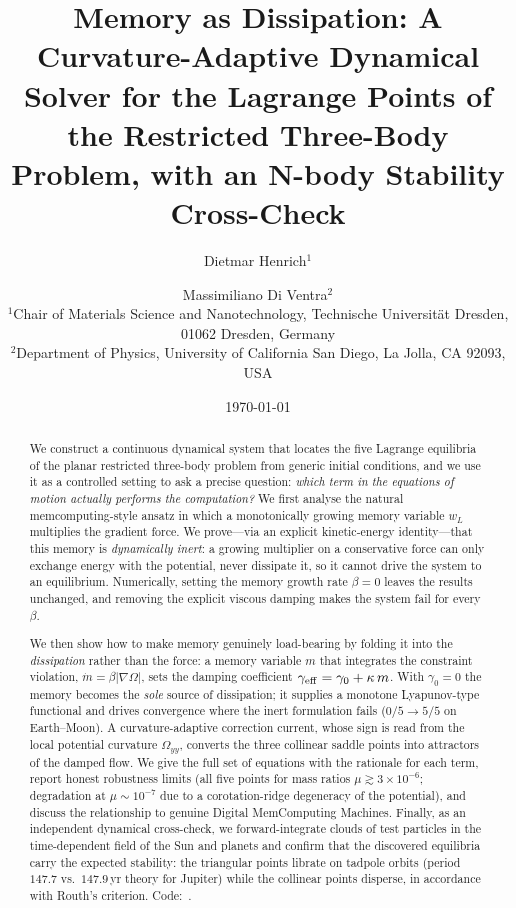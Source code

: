 \documentclass[10pt,twocolumn]{article}
\title{\textbf{Memory as Dissipation: A Curvature-Adaptive Dynamical
Solver for the Lagrange Points of the Restricted Three-Body Problem,
with an N-body Stability Cross-Check}}
\author{
  Dietmar Henrich$^{1}$ \and Massimiliano Di Ventra$^{2}$\\[4pt]
  \small $^{1}$Chair of Materials Science and Nanotechnology,
  Technische Universit\"{a}t Dresden, 01062 Dresden, Germany\\
  \small $^{2}$Department of Physics, University of California San Diego,
  La Jolla, CA 92093, USA
}
\date{\today}
\begin{document}
\maketitle

\begin{abstract}
We construct a continuous dynamical system that locates the five Lagrange
equilibria of the planar restricted three-body problem from generic initial
conditions, and we use it as a controlled setting to ask a precise question:
\emph{which term in the equations of motion actually performs the
computation?} We first analyse the natural memcomputing-style ansatz in which a
monotonically growing memory variable $w_L$ multiplies the gradient force. We
prove---via an explicit kinetic-energy identity---that this memory is
\emph{dynamically inert}: a growing multiplier on a conservative force can only
exchange energy with the potential, never dissipate it, so it cannot drive the
system to an equilibrium. Numerically, setting the memory growth rate
$\beta\!=\!0$ leaves the results unchanged, and removing the explicit viscous
damping makes the system fail for every $\beta$.

We then show how to make memory genuinely load-bearing by folding it into the
\emph{dissipation} rather than the force: a memory variable $m$ that integrates
the constraint violation, $\dot m=\beta\lvert\nabla\Omega\rvert$, sets the
damping coefficient $\gamma_{\rm eff}=\gamma_0+\kappa\,m$. With $\gamma_0=0$ the
memory becomes the \emph{sole} source of dissipation; it supplies a monotone
Lyapunov-type functional and drives convergence where the inert formulation
fails ($0/5\!\to\!5/5$ on Earth--Moon). A curvature-adaptive correction current,
whose sign is read from the local potential curvature $\Omega_{yy}$, converts
the three collinear saddle points into attractors of the damped flow. We give
the full set of equations with the rationale for each term, report honest
robustness limits (all five points for mass ratios
$\mu\gtrsim 3\times10^{-6}$; degradation at $\mu\sim10^{-7}$ due to a
corotation-ridge degeneracy of the potential), and discuss the relationship to
genuine Digital MemComputing Machines.
Finally, as an independent dynamical cross-check, we forward-integrate clouds of
test particles in the time-dependent field of the Sun and planets and confirm
that the discovered equilibria carry the expected stability: the triangular
points librate on tadpole orbits (period $147.7$ vs.\ $147.9$\,yr theory for
Jupiter) while the collinear points disperse, in accordance with Routh's
criterion. Code:~\cite{github2026}.
\end{abstract}
\end{document}
